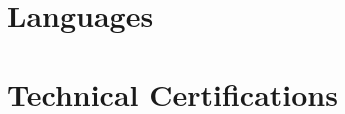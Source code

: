 \documentclass[11pt,a4paper]{article}
\begin{document}


\section{Languages}

\subsection{\languageOne}
\textit{\proficiencyOne}

\subsection{\languageTwo}
\textit{\proficiencyTwo}

\subsection{\languageThree}
\textit{\proficiencyThree}

\section{Technical Certifications}
\begin{itemize}
    \certifications
\end{itemize}
\end{document}
